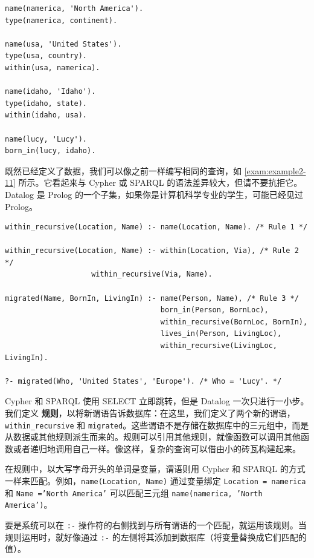 \label{exam:example2-10}
\begin{lstlisting}[caption={用 Datalog 来表示图 2-5 中的数据子集}]
name(namerica, 'North America').
type(namerica, continent).

name(usa, 'United States').
type(usa, country).
within(usa, namerica).

name(idaho, 'Idaho').
type(idaho, state).
within(idaho, usa).

name(lucy, 'Lucy').
born_in(lucy, idaho).
\end{lstlisting}

既然已经定义了数据，我们可以像之前一样编写相同的查询，如 \autoref{exam:example2-11} 所示。它看起来与 Cypher 或 SPARQL 的语法差异较大，但请不要抗拒它。Datalog 是 Prolog 的一个子集，如果你是计算机科学专业的学生，可能已经见过 Prolog。

\label{exam:example2-11}
\begin{lstlisting}[caption={与示例 2-4 相同的查询，用 Datalog 表示}]
within_recursive(Location, Name) :- name(Location, Name). /* Rule 1 */

within_recursive(Location, Name) :- within(Location, Via), /* Rule 2 */
                    within_recursive(Via, Name).

migrated(Name, BornIn, LivingIn) :- name(Person, Name), /* Rule 3 */
                                    born_in(Person, BornLoc),
                                    within_recursive(BornLoc, BornIn),
                                    lives_in(Person, LivingLoc),
                                    within_recursive(LivingLoc, LivingIn).

?- migrated(Who, 'United States', 'Europe'). /* Who = 'Lucy'. */
\end{lstlisting}

Cypher 和 SPARQL 使用 SELECT 立即跳转，但是 Datalog 一次只进行一小步。我们定义 \textbf{规则}，以将新谓语告诉数据库：在这里，我们定义了两个新的谓语，\texttt{within\_recursive} 和 \texttt{migrated}。这些谓语不是存储在数据库中的三元组中，而是从数据或其他规则派生而来的。规则可以引用其他规则，就像函数可以调用其他函数或者递归地调用自己一样。像这样，复杂的查询可以借由小的砖瓦构建起来。

在规则中，以大写字母开头的单词是变量，谓语则用 Cypher 和 SPARQL 的方式一样来匹配。例如，\texttt{name(Location, Name)} 通过变量绑定 \texttt{Location = namerica} 和 \texttt{Name ='North America'} 可以匹配三元组 \texttt{name(namerica, 'North America')}。

要是系统可以在 \texttt{:-} 操作符的右侧找到与所有谓语的一个匹配，就运用该规则。当规则运用时，就好像通过 \texttt{:-} 的左侧将其添加到数据库（将变量替换成它们匹配的值）。


